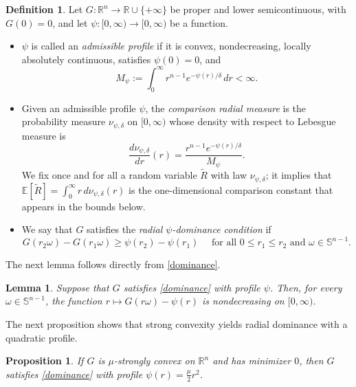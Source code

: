 \documentclass[11pt]{article}
\newcommand{\1}{\mathds{1}}
\newtheorem{proposition}[theorem]{Proposition}
\newtheorem{lemma}[theorem]{Lemma}
\theoremstyle{definition}
\newtheorem{definition}[theorem]{Definition}
\theoremstyle{remark}
\theoremstyle{definition}
\begin{document}
\begin{definition}Let $G\colon \mathbb{R}^n \to \mathbb{R}\cup \{+\infty\}$ be proper and lower semicontinuous, with $G(0)=0$, and let  $\psi\colon [0,\infty)\to [0,\infty)$ be a function. 
    \begin{itemize}
        \item $\psi$ is called an \emph{admissible profile} if it is convex, nondecreasing, locally absolutely continuous, satisfies $\psi(0)=0$, and 
        \begin{equation}\label{Admissible}
        M_{\psi} := \int_{0}^{\infty} r^{n-1}e^{-\psi(r)/\delta}\,dr <\infty.
        \end{equation}
        
        \item Given an admissible profile $\psi$, the \emph{comparison radial measure} is the probability measure  $\nu_{\psi,\delta}$ on $[0,\infty)$ whose density with respect to
    Lebesgue measure is
        $$
        \frac{d\nu_{\psi,\delta}}{dr}(r)=\frac{r^{n-1}e^{-\psi(r)/\delta}}{M_{\psi}}.
        $$
        We fix once and for all a random variable $\widetilde R$ with law $\nu_{\psi,\delta}$; it implies that  $\mathbb{E}[\widetilde R]=\int_0^\infty r\,d\nu_{\psi,\delta}(r)$ is the one-dimensional comparison constant that appears in the bounds below.
        \item   We say that $G$ satisfies the \emph{radial $\psi$-dominance condition} if
        \begin{equation}\label{dominance}
        G(r_2\omega)-G(r_1 \omega)\geq \psi(r_2)-\psi(r_1) \quad \textrm{ for all } 0\leq r_1\leq r_2 \textrm{ and } \omega \in \mathbb{S}^{n-1}.
        \end{equation}
    \end{itemize}
\end{definition}

The next lemma follows directly from \eqref{dominance}.
\begin{lemma}\label{radial-monotonicity}
Suppose that $G$ satisfies \eqref{dominance} with profile $\psi$. Then, for every $\omega\in\mathbb{S}^{n-1}$, the function $r\longmapsto G(r\omega)-\psi(r)$ is nondecreasing on $[0,\infty)$.
\end{lemma}
The next proposition shows that strong convexity yields radial dominance with a quadratic profile.
\begin{proposition}\label{dominance-strongly-convex}
If \(G\) is \(\mu\)-strongly convex on \(\mathbb{R}^n\) and has minimizer \(0\), then \(G\) satisfies \eqref{dominance} with profile \(\psi(r)=\frac{\mu}{2}r^2\).
\end{proposition}
\end{document}
